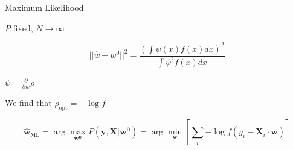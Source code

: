 \documentclass[pdf]{beamer}
\newcommand{\ra}{\rightarrow}
\begin{document}
\begin{frame}{Maximum Likelihood}


$P$ fixed, $N\ra \infty$

\begin{equation*}
||\hat{w}-w^0||^2 = \frac{\left(\int{\psi(x)f(x)dx}\right)^2}{\int{\psi^2f(x)dx}}
\end{equation*}

$\psi = \frac{\partial}{\partial w} \rho$

\vspace{.2in}
We find that $\rho_{\text{opt}} = -\log f$


\begin{equation*}
\mathbf{\hat{w}}_{\text{ML}}=\arg\max_{\mathbf{w^0}}{P\left(\mathbf{y},\mathbf{X}|\mathbf{w^0}\right)} =\arg \min_{\mathbf{w}}{\left[ \sum_{i} {-\log f\left( y_i - \mathbf{X}_{i} \cdot \mathbf{w}\right)}\right]}
\end{equation*}





\end{frame}
\end{document}
